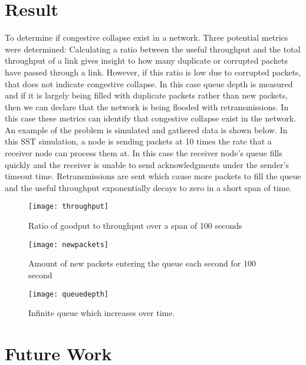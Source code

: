 \documentclass{article}
\begin{document}
\section{Result} %

To determine if congestive collapse exist in a network. Three potential metrics were determined:\newline
\indent Calculating a ratio between the useful throughput and the total throughput of a link gives insight to how many duplicate or corrupted packets have passed through a link. However, if this ratio is low due to corrupted packets, that does not indicate congestive collapse. In this case queue depth is measured and if it is largely being filled with duplicate packets rather than new packets, then we can declare that the network is being flooded with retransmissions. In this case these metrics can identify that congestive collapse exist in the network.\newline
\indent An example of the problem is simulated and gathered data is shown below. In this SST simulation, a node is sending packets at 10 times the rate that a receiver node can process them at. In this case the receiver node's queue fills quickly and the receiver is unable to send acknowledgments under the sender's timeout time. Retransmissions are sent which cause more packets to fill the queue and the useful throughput exponentially decays to zero in a short span of time. \newline\newline

\begin{figure}[H]
\texttt{[image: throughput]}
\centering
\caption{Ratio of goodput to throughput over a span of 100 seconds}
\end{figure}

\begin{figure}[H]
	\texttt{[image: newpackets]}
	\centering
	\caption{Amount of new packets entering the queue each second for 100 second}
\end{figure}

\begin{figure}[H]
	\texttt{[image: queuedepth]}
	\centering
	\caption{Infinite queue which increases over time.}
\end{figure}

\section{Future Work}
\end{document}
